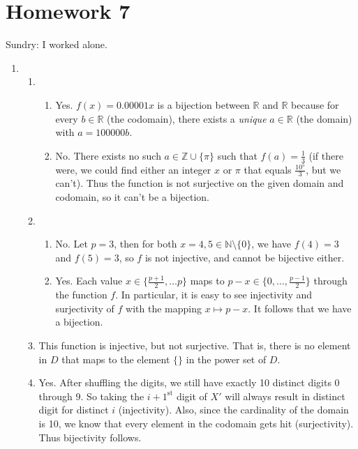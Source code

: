 \section{Homework 7}

Sundry: I worked alone.

\begin{enumerate}
    \item \begin{enumerate}
        \item \begin{enumerate}
            \item Yes. $f(x) = 0.00001x$ is a bijection between $\mathbb{R}$ and $\mathbb{R}$ because for every $b \in \mathbb{R}$ (the codomain), there exists a \textit{unique} $a \in \mathbb{R}$ (the domain) with $a = 100000b$.
            
            \item No. There exists no such $a \in \mathbb{Z} \cup \{\pi\}$ such that $f(a) = \frac{1}{3}$ (if there were, we could find either an integer $x$ or $\pi$ that equals $\frac{10^5}{3}$, but we can't). Thus the function is not surjective on the given domain and codomain, so it can't be a bijection.
        \end{enumerate}
        
        \item \begin{enumerate}
            \item No. Let $p = 3$, then for both $x = 4, 5 \in \mathbb{N} \setminus \{0\}$, we have $f(4) = 3$ and $f(5) = 3$, so $f$ is not injective, and cannot be bijective either.
            
            \item Yes. Each value $x \in \{\frac{p+1}{2}, \ldots p\}$ maps to $p - x \in \{0, \ldots, \frac{p-1}{2}\}$ through the function $f$. In particular, it is easy to see injectivity and surjectivity of $f$ with the mapping $x \mapsto p - x$. It follows that we have a bijection.
        \end{enumerate}
        
        \item This function is injective, but not surjective. That is, there is no element in $D$ that maps to the element $\{\}$ in the power set of $D$.
        
        \item Yes. After shuffling the digits, we still have exactly 10 distinct digits 0 through 9. So taking the $i+1^{\text{st}}$ digit of $X'$ will always result in distinct digit for distinct $i$ (injectivity). Also, since the cardinality of the domain is 10, we know that every element in the codomain gets hit (surjectivity). Thus bijectivity follows.
    \end{enumerate}
    

\end{enumerate}
